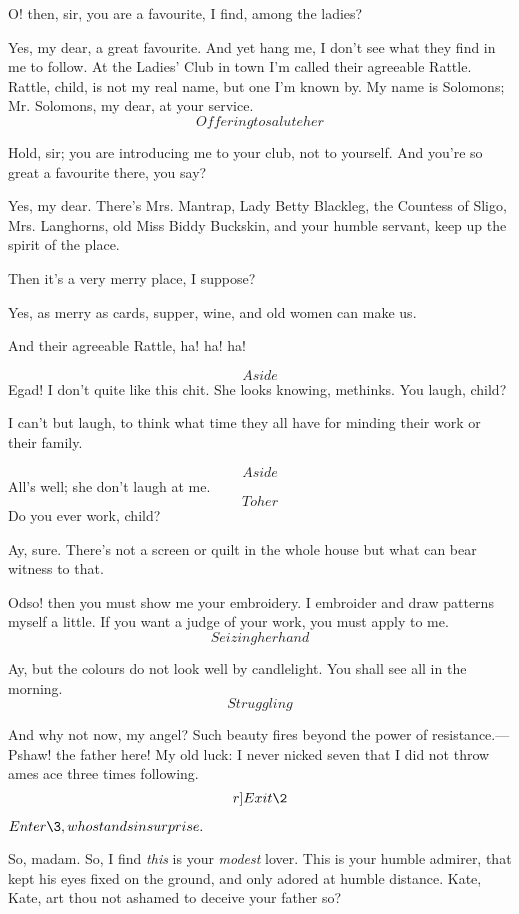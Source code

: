 \documentclass{book}
\begin{document}
\8  O! then, sir, you are a favourite, I find, among the
ladies?

\2  Yes, my dear, a great favourite.  And yet hang me, I don't see
what they find in me to follow.  At the Ladies' Club in town I'm called
their agreeable Rattle.  Rattle, child, is not my real name, but one
I'm known by.  My name is Solomons; Mr. Solomons, my dear, at your
service.  \[Offering to salute her\]

\8  Hold, sir; you are introducing me to your club, not
to yourself.  And you're so great a favourite there, you say?

\2  Yes, my dear.  There's Mrs. Mantrap, Lady Betty Blackleg, the
Countess of Sligo, Mrs. Langhorns, old Miss Biddy Buckskin, and your
humble servant, keep up the spirit of the place.

\8  Then it's a very merry place, I suppose?

\2  Yes, as merry as cards, supper, wine, and old women can make
us.

\8  And their agreeable Rattle, ha! ha! ha!

\2  \[Aside\]  Egad! I don't quite like this chit.  She looks
knowing, methinks.  You laugh, child?

\8  I can't but laugh, to think what time they all have
for minding their work or their family.

\2  \[Aside\]  All's well; she don't laugh at me.  \[To her\]  Do
you ever work, child?

\8  Ay, sure.  There's not a screen or quilt in the
whole house but what can bear witness to that.

\2  Odso! then you must show me your embroidery.  I embroider and
draw patterns myself a little.  If you want a judge of your work, you
must apply to me.  \[Seizing her hand\]

\8  Ay, but the colours do not look well by candlelight. 
You shall see all in the morning.  \[Struggling\]

\2  And why not now, my angel?  Such beauty fires beyond the
power of resistance.---Pshaw! the father here!  My old luck: I never
nicked seven that I did not throw ames ace three times following. 
\[r]Exit \2\]


\(Enter \3, who stands in surprise.\)


\3  So, madam.  So, I find \textit{this} is your \textit{modest} lover.  This is
your humble admirer, that kept his eyes fixed on the ground, and only
adored at humble distance.  Kate, Kate, art thou not ashamed to deceive
your father so?
\end{document}
